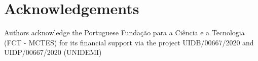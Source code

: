\documentclass[3p,times,procedia]{elsarticle}
\begin{document}

%
%




\section*{Acknowledgements}
Authors acknowledge the Portuguese Fundação para a Ciência e a Tecnologia (FCT -
MCTES) for its financial support via the project UIDB/00667/2020 and UIDP/00667/2020 (UNIDEMI)



%
\end{document}
